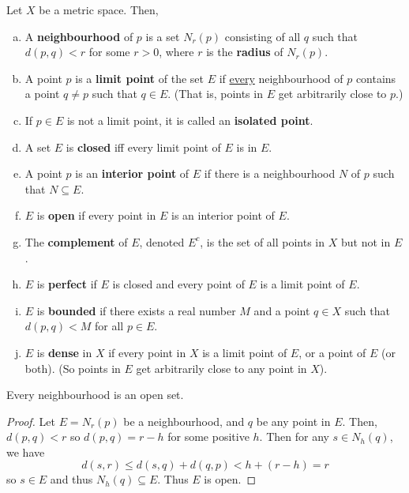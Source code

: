 \begin{definition}
Let $X$ be a metric space. Then, 
\begin{enumerate}[(a)]
\item A \textbf{neighbourhood} of $p$ is a set $N_r(p)$ consisting of all $q$ such that $d(p, q) < r$ for some $r > 0$, where $r$ is the \textbf{radius} of $N_r(p)$.

\item A point $p$ is a \textbf{limit point} of the set $E$ if \underline{every} neighbourhood of $p$ contains a point $q \ne p$ such that $q \in E$. (That is, points in $E$ get arbitrarily close to $p$.)

\item If $p \in E$ is not a limit point, it is called an \textbf{isolated point}.

\item A set $E$ is \textbf{closed} iff every limit point of $E$ is in $E$.

\item A point $p$ is an \textbf{interior point} of $E$ if there is a neighbourhood $N$ of $p$ such that $N \subseteq E$.

\item $E$ is \textbf{open} if every point in $E$ is an interior point of $E$.

\item The \textbf{complement} of $E$, denoted $E^c$, is the set of all points in $X$ but not in $E$.

\item $E$ is \textbf{perfect} if $E$ is closed and every point of $E$ is a limit point of $E$.

\item $E$ is \textbf{bounded} if there exists a real number $M$ and a point $q \in X$ such that $d(p, q) < M$ for all $p \in E$.

\item $E$ is \textbf{dense} in $X$ if every point in $X$ is a limit point of $E$, or a point of $E$ (or both). (So points in $E$ get arbitrarily close to any point in $X$).
\end{enumerate}
\end{definition}

\begin{theorem}
Every neighbourhood is an open set.

\begin{proof}
Let $E = N_r(p)$ be a neighbourhood, and $q$ be any point in $E$. Then, $d(p, q) < r$ so $d(p, q) = r - h$ for some positive $h$. Then for any $s \in N_h(q)$, we have
\[
	d(s, r) \le d(s, q) + d(q, p) < h + (r - h) = r
\]
so $s \in E$ and thus $N_h(q) \subseteq E$. Thus $E$ is open.
\end{proof}
\end{theorem}

